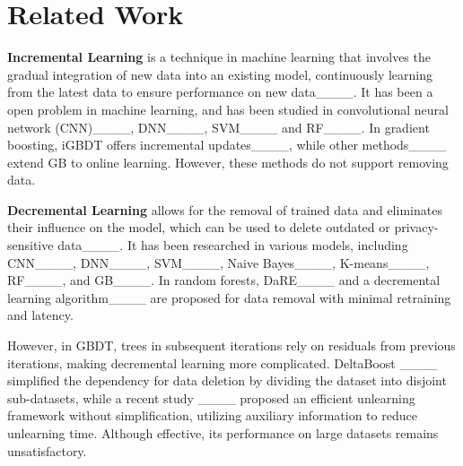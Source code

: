 \section{Related Work}
\vspace{-.02in}
\textbf{Incremental Learning} is a technique in machine learning that involves the gradual integration of new data into an existing model, continuously learning from the latest data to ensure performance on new data____. It has been a open problem in machine learning, and has been studied in convolutional neural network (CNN)____, DNN____, SVM____ and RF____. In gradient boosting, iGBDT offers incremental updates____, while other methods____ extend GB to online learning. However, these methods do not support removing data.


\textbf{Decremental Learning} allows for the removal of trained data and eliminates their influence on the model, which can be used to delete outdated or privacy-sensitive data____. It has been researched in various models, including CNN____, DNN____, SVM____, Naive Bayes____, K-means____, RF____, and GB____. In random forests, DaRE____ and a decremental learning algorithm____ are proposed for data removal with minimal retraining and latency.

However, in GBDT, trees in subsequent iterations rely on residuals from previous iterations, making decremental learning more complicated. DeltaBoost ____ simplified the dependency for data deletion by dividing the dataset into disjoint sub-datasets, while a recent study ____ proposed an efficient unlearning framework without simplification, utilizing auxiliary information to reduce unlearning time. Although effective, its performance on large datasets remains unsatisfactory.



\vspace{-.08in}